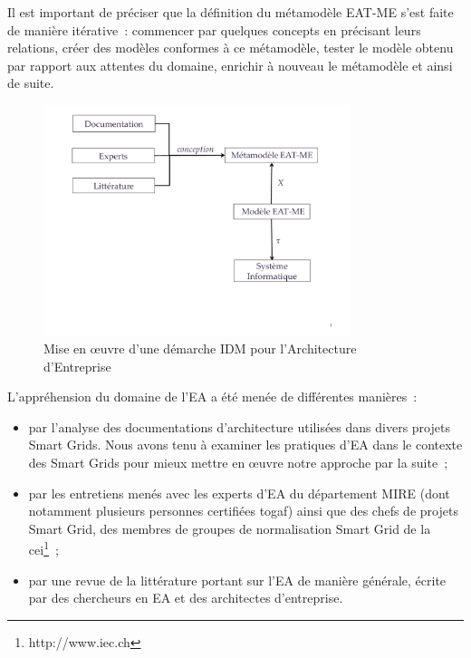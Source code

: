     Il est important de préciser que la définition du métamodèle EAT-ME s'est faite de manière
    itérative~: commencer par quelques concepts en précisant leurs relations,
    créer des modèles conformes à ce métamodèle, tester le modèle obtenu par rapport
    aux attentes du domaine, enrichir à nouveau le métamodèle et ainsi de suite.



    \begin{figure}[!ht]
         \begin{center}
        \includegraphics[trim=0cm 4cm 0cm 0cm, width=0.8\textwidth]{figures/4_demarche/demarche_idm.pdf}
         \end{center}
         \caption{Mise en œuvre d'une démarche IDM pour l'Architecture
         d'Entreprise}
         \label{fig:demarche_idem}
    \end{figure}

    L'appréhension du domaine de l'EA a été menée de différentes manières~:

    \begin{itemize}

        \item par l'analyse des documentations d'architecture utilisées dans divers projets Smart
    Grids. Nous avons tenu à examiner les pratiques d'EA dans le contexte des Smart Grids
    pour mieux mettre en œuvre notre approche par la suite~;

        \item par les entretiens menés avec les experts d'EA du département MIRE (dont notamment
    plusieurs personnes certifiées \gls{togaf}) ainsi que des chefs de projets Smart Grid,
    des membres de groupes de normalisation Smart Grid de la \gls{cei}\footnote{http://www.iec.ch}~;

        \item par une revue de la littérature portant sur l'EA de manière générale,
        écrite par des chercheurs en EA et des architectes d'entreprise.

    \end{itemize}

